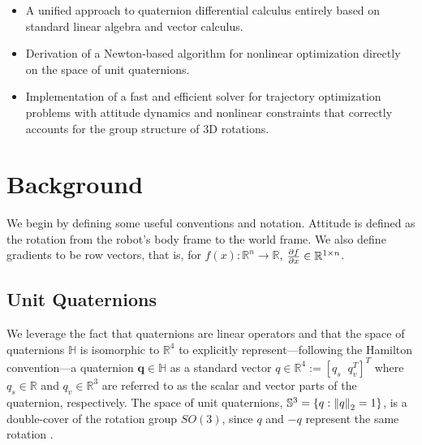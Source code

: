 \documentclass[letterpaper, 10 pt, conference]{ieeeconf}  %
\newcommand{\R}{\mathbb{R}}
\newcommand{\Q}{\mathbb{S}^3}
\newcommand{\q}{\textbf{q}}
\begin{document}
    \begin{itemize}
        \item A unified approach to quaternion differential calculus entirely based on
        standard linear algebra and vector calculus.
        \item Derivation of a Newton-based algorithm for nonlinear optimization directly
        on the space of unit quaternions.
        \item Implementation of a fast and efficient solver for trajectory optimization
        problems with attitude dynamics and nonlinear constraints that correctly accounts
        for the group structure of 3D rotations.
    \end{itemize}


\section{Background}

    We begin by defining some useful conventions and notation. 
    Attitude is defined as the rotation from the robot's body frame to the world frame.
    We also define gradients to be row vectors, that is, for 
        $f(x) : \R^n \to \R$, $\pdv{f}{x} \in \R^{1\times n}$.

    \subsection{Unit Quaternions} \label{sec:quaternions}
        We leverage the fact that quaternions are linear operators and that the space of
        quaternions $\mathbb{H}$ is isomorphic to $\R^4$ to explicitly
        represent---following the Hamilton convention---a quaternion $\q \in \mathbb{H}$
        as a standard vector $q \in \R^4 := [q_s \;\; q_v^T]^T$ where $q_s \in \R$ and
        $q_v \in \R^3$ are referred to as the scalar and vector parts of the quaternion,
        respectively. The space of unit quaternions, $\Q = \{q : \norm{q}_2 = 1\}$, is a 
        double-cover of the rotation group $SO(3)$, since $q$ and $-q$ represent the same 
        rotation \cite{markley2014fundamentals}.
        
\end{document}
